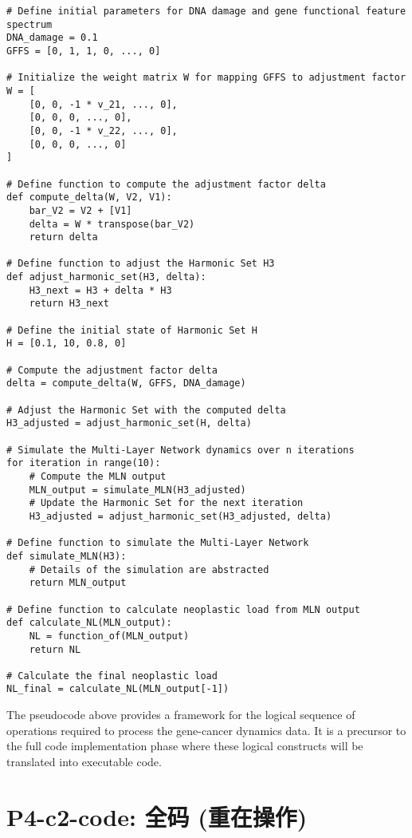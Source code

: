 \documentclass{article}
\begin{document}
\begin{verbatim}
# Define initial parameters for DNA damage and gene functional feature spectrum
DNA_damage = 0.1
GFFS = [0, 1, 1, 0, ..., 0]

# Initialize the weight matrix W for mapping GFFS to adjustment factor
W = [
    [0, 0, -1 * v_21, ..., 0],
    [0, 0, 0, ..., 0],
    [0, 0, -1 * v_22, ..., 0],
    [0, 0, 0, ..., 0]
]

# Define function to compute the adjustment factor delta
def compute_delta(W, V2, V1):
    bar_V2 = V2 + [V1]
    delta = W * transpose(bar_V2)
    return delta

# Define function to adjust the Harmonic Set H3
def adjust_harmonic_set(H3, delta):
    H3_next = H3 + delta * H3
    return H3_next

# Define the initial state of Harmonic Set H
H = [0.1, 10, 0.8, 0]

# Compute the adjustment factor delta
delta = compute_delta(W, GFFS, DNA_damage)

# Adjust the Harmonic Set with the computed delta
H3_adjusted = adjust_harmonic_set(H, delta)

# Simulate the Multi-Layer Network dynamics over n iterations
for iteration in range(10):
    # Compute the MLN output
    MLN_output = simulate_MLN(H3_adjusted)
    # Update the Harmonic Set for the next iteration
    H3_adjusted = adjust_harmonic_set(H3_adjusted, delta)

# Define function to simulate the Multi-Layer Network
def simulate_MLN(H3):
    # Details of the simulation are abstracted
    return MLN_output

# Define function to calculate neoplastic load from MLN output
def calculate_NL(MLN_output):
    NL = function_of(MLN_output)
    return NL

# Calculate the final neoplastic load
NL_final = calculate_NL(MLN_output[-1])

\end{verbatim}

The pseudocode above provides a framework for the logical sequence of operations required to process the gene-cancer dynamics data. It is a precursor to the full code implementation phase where these logical constructs will be translated into executable code.



\section{P4-c2-code: 全码 (重在操作)}
\end{document}
